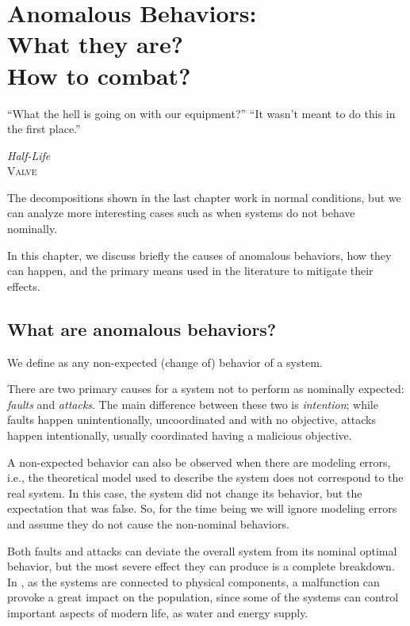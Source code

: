 \documentclass[../main.tex]{subfiles}
\begin{document}
\chapter[Anomalous Behaviors --- What they are and how to combat]{Anomalous Behaviors:\\What they are?\\How to combat?}\label{sec:anomalous}


\epigraph{``What the hell is going on with our equipment?''
``It wasn't meant to do this in the first place.''}
{\textit{Half-Life}\\\textsc{Valve}}

The decompositions shown in the last chapter work in normal conditions, but we can analyze more interesting cases such as when systems do not behave nominally.

In this chapter, we discuss briefly the causes of anomalous behaviors, how they can happen, and the primary means used in the literature to mitigate their effects.

\minitoc%

\section{What are anomalous behaviors?}
We define \emph{\anomalousbehaviors} as any non-expected (change of) behavior of a system.

There are two primary causes for a system not to perform as nominally expected: \emph{faults} and \emph{attacks}.
The main difference between these two is \emph{intention}; while faults happen unintentionally, uncoordinated and with no objective, attacks happen intentionally, usually coordinated having a malicious objective.

\begin{remark}
  A non-expected behavior can also be observed when there are modeling errors, i.e., the theoretical model used to describe the system does not correspond to the real system.
  In this case, the system did not change its behavior, but the expectation that was false.
  So, for the time being we will ignore modeling errors and assume they do not cause the non-nominal behaviors.
\end{remark}

Both faults and attacks can deviate the overall system from its nominal optimal behavior, but the most severe effect they can produce is a complete breakdown.
In \cps{}, as the systems are connected to physical components, a malfunction can provoke a great impact on the population, since some of the systems can control important
aspects of modern life, as water and energy supply.
\end{document}
